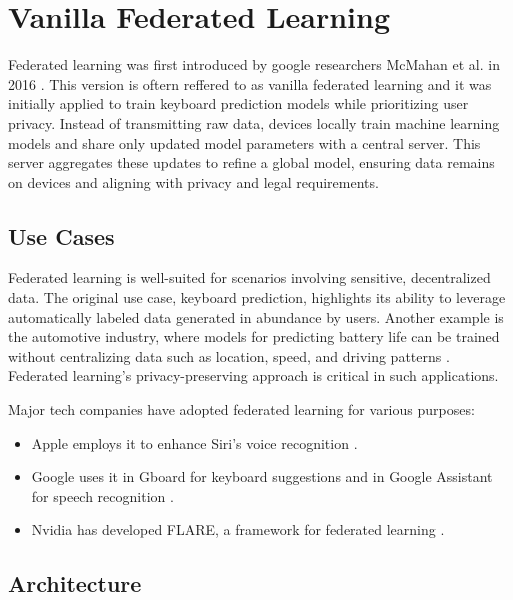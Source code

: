 \section{Vanilla Federated Learning}\label{sec:vanilla-fl}
Federated learning was first introduced by google researchers McMahan et al. in 2016 \cite{McMahan2016}.
This version is oftern reffered to as vanilla federated learning and it was initially applied to
train keyboard prediction models while prioritizing user privacy. Instead of transmitting raw data, devices
locally train machine learning models and share only updated model parameters with a central server. This
server aggregates these updates to refine a global model, ensuring data remains on devices and aligning with
privacy and legal requirements.

\subsection{Use Cases}

Federated learning is well-suited for scenarios involving sensitive, decentralized data. The original use
case, keyboard prediction, highlights its ability to leverage automatically labeled data generated in
abundance by users. Another example is the automotive industry, where models for predicting battery life can
be trained without centralizing data such as location, speed, and driving patterns \cite{TESLA}. Federated
learning's privacy-preserving approach is critical in such applications.

Major tech companies have adopted federated learning for various purposes:
\begin{itemize}
  \item Apple employs it to enhance Siri's voice recognition \cite{apple_fl}.
  \item Google uses it in Gboard for keyboard suggestions and in Google Assistant for speech recognition
    \cite{google_fl}.
  \item Nvidia has developed FLARE, a framework for federated learning \cite{FLARE}.
\end{itemize}

\subsection{Architecture}

